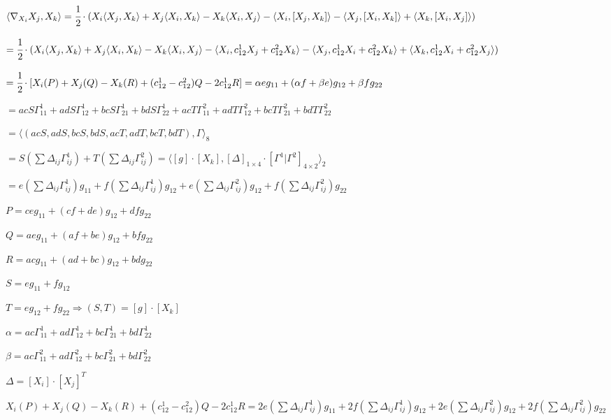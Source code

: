 \documentclass[10pt,a4paper]{article}
\begin{document}
		$\langle \nabla_{X_i} X_j, X_k \rangle = \cfrac{1}{2} \cdot (X_i\langle X_j,X_k\rangle + X_j\langle X_i,X_k\rangle - X_k\langle X_i,X_j\rangle - \langle X_i, [X_j,X_k]\rangle - \langle X_j, [X_i,X_k]\rangle + \langle X_k, [X_i,X_j]\rangle)$

		$= \cfrac{1}{2} \cdot (X_i\langle X_j,X_k\rangle + X_j\langle X_i,X_k\rangle - X_k\langle X_i,X_j\rangle - \langle X_i, c_{12}^1X_j + c_{12}^2X_k\rangle - \langle X_j, c_{12}^1X_i + c_{12}^2X_k\rangle + \langle X_k, c_{12}^1X_i + c_{12}^2X_j\rangle)$

		$= \cfrac{1}{2} \cdot [X_i (P) + X_j (Q) - X_k(R) + (c_{12}^1 - c_{12}^2)Q - 2 c_{12}^1 R] = \alpha e g_{11} + (\alpha f + \beta e) g_{12} + \beta f g_{22}$

		$= ac S\Gamma_{11}^1  + ad S\Gamma_{12}^1 + bc S\Gamma_{21}^1 + bd S\Gamma_{22}^1 + acT\Gamma_{11}^2 + adT \Gamma_{12}^2 + bcT\Gamma_{21}^2 + bdT \Gamma_{22}^2$

		$= \langle (acS, adS, bcS, bdS, acT, adT, bcT, bdT) , \Gamma \rangle_8$

		$= S (\sum \Delta_{ij} \Gamma_{ij}^1) + T (\sum \Delta_{ij} \Gamma_{ij}^2) = \langle [g] \cdot [X_k], [\Delta]_{1 \times 4} \cdot [\Gamma^1 | \Gamma^2]_{4 \times 2} \rangle_2$

		$= e (\sum \Delta_{ij} \Gamma_{ij}^1) g_{11} + f (\sum \Delta_{ij} \Gamma_{ij}^1) g_{12} + e (\sum \Delta_{ij} \Gamma_{ij}^2) g_{12} + f (\sum \Delta_{ij} \Gamma_{ij}^2) g_{22}$

		$P = c e g_{11} + (c f + d e) g_{12} + d f g_{22}$

		$Q = a e g_{11} + (a f + b e) g_{12} + b f g_{22}$

		$R = ac g_{11} + (ad + bc) g_{12} + bd g_{22}$

		$S = e g_{11} + f g_{12}$

		$T = e g_{12} + f g_{22} \Rightarrow (S, T) = [g] \cdot [X_k]$

		$\alpha = ac\Gamma_{11}^1  + ad\Gamma_{12}^1 + bc\Gamma_{21}^1 + bd\Gamma_{22}^1$

		$\beta = ac\Gamma_{11}^2  + ad\Gamma_{12}^2  + bc\Gamma_{21}^2  + bd\Gamma_{22}^2$

		$\Delta = [X_i] \cdot [X_j]^T$

		$X_i (P) + X_j (Q) - X_k(R) + (c_{12}^1 - c_{12}^2)Q - 2 c_{12}^1 R = 2e (\sum \Delta_{ij} \Gamma_{ij}^1) g_{11} + 2f (\sum \Delta_{ij} \Gamma_{ij}^1) g_{12} + 2e (\sum \Delta_{ij} \Gamma_{ij}^2) g_{12} + 2f (\sum \Delta_{ij} \Gamma_{ij}^2) g_{22}$
\end{document}
